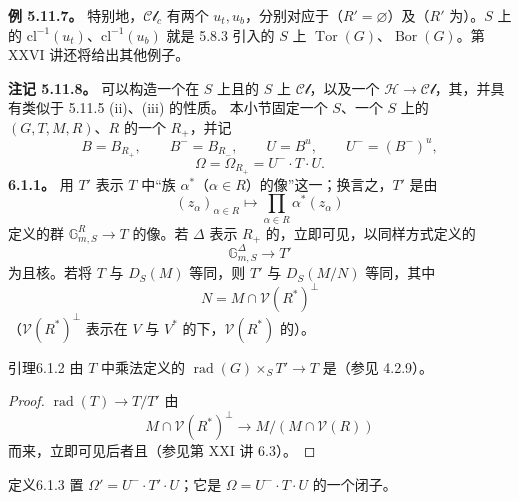 \textbf{例 5.11.7。} 特别地，$\mathcal{Cl}_c$ 有两个 $u_t,u_b$，分别对应于（$R'=\varnothing$）及（$R'$ 为）。$S$ 上的 $\mathrm{cl}^{-1}(u_t)$、$\mathrm{cl}^{-1}(u_b)$ 就是 5.8.3 引入的 $S$ 上 $\operatorname{Tor}(G)$、$\operatorname{Bor}(G)$。第 XXVI 讲还将给出其他例子。

\textbf{注记 5.11.8。} 可以构造一个在 $S$ 上且的 $S$ 上 $\mathcal{Cl}$，以及一个 $\mathcal H\to\mathcal{Cl}$，其，并具有类似于 5.11.5 (ii)、(iii) 的性质。
本小节固定一个 $S$、一个 $S$ 上的 $(G,T,M,R)$、$R$ 的一个 $R_+$，并记
\[B=B_{R_+},\qquad B^-=B_{R_-},\qquad U=B^u,\qquad U^-=(B^-)^u,\]
\[\Omega=\Omega_{R_+}=U^-\cdot T\cdot U.\]
\textbf{6.1.1。} 用 $T'$ 表示 $T$ 中“族 $\alpha^*$（$\alpha\in R$）的像”这一；换言之，$T'$ 是由
\[(z_\alpha)_{\alpha\in R}\longmapsto\prod_{\alpha\in R}\alpha^*(z_\alpha)\]
定义的群 $\mathbb G_{m,S}^R\to T$ 的像。若 $\Delta$ 表示 $R_+$ 的，立即可见，以同样方式定义的
\[\mathbb G_{m,S}^\Delta\longrightarrow T'\]
为且核。若将 $T$ 与 $D_S(M)$ 等同，则 $T'$ 与 $D_S(M/N)$ 等同，其中
\[N=M\cap\mathscr V(R^*)^\perp\]
（$\mathscr V(R^*)^\perp$ 表示在 $V$ 与 $V^*$ 的下，$\mathscr V(R^*)$ 的）。
\begin{SGAresult}{引理}{6.1.2}
由 $T$ 中乘法定义的 $\operatorname{rad}(G)\times_ST'\to T$ 是（参见 4.2.9）。
\end{SGAresult}
\begin{proof}
 $\operatorname{rad}(T)\to T/T'$ 由
\[M\cap\mathscr V(R^*)^\perp\longrightarrow M/(M\cap\mathscr V(R))\]
而来，立即可见后者且（参见第 XXI 讲 6.3）。
\end{proof}
\begin{SGAresult}{定义}{6.1.3}
置 $\Omega'=U^-\cdot T'\cdot U$；它是 $\Omega=U^-\cdot T\cdot U$ 的一个闭子。
\end{SGAresult}
